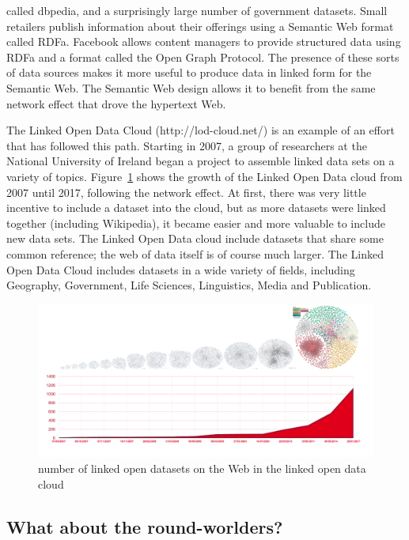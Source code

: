 called dbpedia, and a surprisingly large number of government datasets.
Small retailers publish information about their offerings using a
Semantic Web format called RDFa. Facebook allows content managers to
provide structured data using RDFa and a format called the Open Graph
Protocol. The presence of these sorts of data sources makes it more
useful to produce data in linked form for the Semantic Web. The Semantic
Web design allows it to benefit from the same network effect that drove
the hypertext Web.

The Linked Open Data Cloud (http://lod-cloud.net/) is an example of an
effort that has followed this path. Starting in 2007, a group of
researchers at the National University of Ireland began a project to
assemble linked data sets on a variety of topics. Figure~\ref{fig:ch1.1} shows the
growth of the Linked Open Data cloud from 2007 until 2017, following the
network effect. At first, there was very little incentive to include a
dataset into the cloud, but as more datasets were linked together
(including Wikipedia), it became easier and more valuable to include new
data sets. The Linked Open Data cloud include datasets that share some
common reference; the web of data itself is of course much larger. The
Linked Open Data Cloud includes datasets in a wide variety of fields,
including Geography, Government, Life Sciences, Linguistics, Media and
Publication.

\begin{figure}
    \centering
    \includegraphics[width=5.0in]{media/image1.png}
    \caption{number of linked open datasets on the Web in the linked open
data cloud}
    \label{fig:ch1.1}
\end{figure}


\subsection{What about the round-worlders?}

